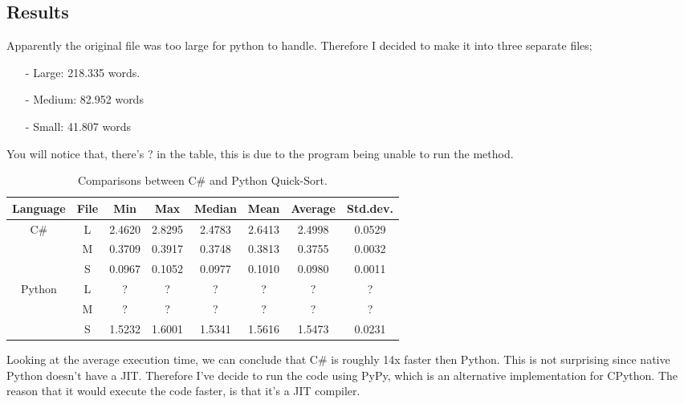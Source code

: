 \subsection{Results}
\label{sec:results}

Apparently the original file was too large for python to handle. Therefore I decided to make it into three separate files; 

\begin{itemize}
  \item[-] Large: 218.335 words.
  \item[-] Medium: 82.952 words
  \item[-] Small: 41.807 words
\end{itemize}

\noindent You will notice that, there's ? in the table, this is due to the program being unable to run the method.

\begin{table}[H]
\centering
\small
    \begin{tabular}{|c|c|c|c|c|c|c|c|} 
    \hline
        Language & File & Min & Max & Median & Mean & Average & Std.dev.\\
    \hline
        \multirow{3}{4em}{C\#} & L & 2.4620 & 2.8295 & 2.4783 & 2.6413 & 2.4998 & 0.0529 \\ 
        & M & 0.3709 & 0.3917 & 0.3748 & 0.3813 & 0.3755 & 0.0032 \\ 
        & S & 0.0967 & 0.1052 & 0.0977 & 0.1010 & 0.0980 & 0.0011 \\ 
    \hline
        \multirow{3}{4em}{Python} & L & ? & ? & ? & ? & ? & ? \\ 
        & M & ? & ? & ? & ? & ? & ? \\ 
        & S & 1.5232 & 1.6001 & 1.5341 & 1.5616 & 1.5473 & 0.0231 \\
    \hline
\end{tabular}
\vspace*{-0.3cm}
\caption{\label{tab:table-comparison}Comparisons between C\# and Python Quick-Sort.}
\end{table}

\noindent Looking at the average execution time, we can conclude that C\# is roughly 14x faster then Python. This is not surprising since native Python doesn't have a JIT\cite{tp_py_slow}. Therefore I've decide to run the code using PyPy, which is an alternative implementation for CPython. The reason that it would execute the code faster, is that it's a JIT compiler.

